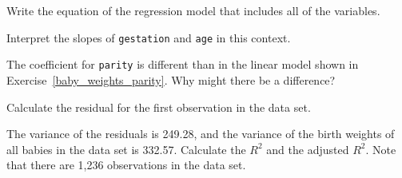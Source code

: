 {\begin{center}
\end{center}
\begin{parts}
\item Write the equation of the regression model that includes all of the 
variables.
\item Interpret the slopes of \texttt{gestation} and \texttt{age} in this 
context.
\item The coefficient for \texttt{parity} is different than in the linear 
model shown in Exercise~\ref{baby_weights_parity}. Why might there be a difference?
\item Calculate the residual for the first observation in the data set.
\item The variance of the residuals is 249.28, and the variance of the birth 
weights of all babies in the data set is 332.57. Calculate the $R^2$ and the 
adjusted $R^2$. Note that there are 1,236 observations in the data set.
\end{parts}
}{}


